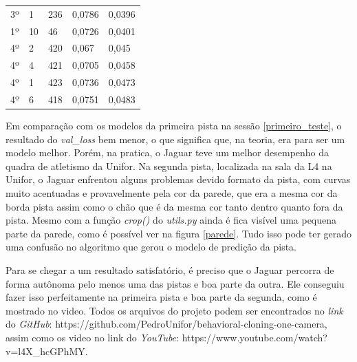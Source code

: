 \begin{table}[H]
\begin{tabular}{|l|l|l|l|l|}
3º                   & 1              & 236                        & 0,0786                 & 0,0396                      \\
1º                   & 10             & 46                         & 0,0726                 & 0,0401                      \\
4º                   & 2              & 420                        & 0,067                  & 0,045                       \\
4º                   & 4              & 421                        & 0,0705                 & 0,0458                      \\
4º                   & 1              & 423                        & 0,0736                 & 0,0473                      \\
4º                   & 6              & 418                        & 0,0751                 & 0,0483 \\ \hline                    
\end{tabular}
\end{table}

Em comparação com os modelos da primeira pista na sessão \ref{primeiro_teste}, o resultado do \textit{val\_loss} bem menor, o que significa que, na teoria, era para ser um modelo melhor. Porém, na pratica, o Jaguar teve um melhor desempenho da quadra de atletismo da Unifor. Na segunda pista, localizada na sala da L4 na Unifor, o Jaguar enfrentou alguns problemas devido formato da pista, com curvas muito acentuadas e provavelmente pela cor da parede, que era a mesma cor da borda pista assim como o chão que é da mesma cor tanto dentro quanto fora da pista. Mesmo com a função \textit{crop()} do \textit{utils.py} ainda é fica visível uma pequena parte da parede, como é possível ver na figura \ref{parede}. Tudo isso pode ter gerado uma confusão no algoritmo que gerou o modelo de predição da pista. 

	\begin{figure}[H]
		\centering
\end{figure}

Para se chegar a um resultado satisfatório, é preciso que o Jaguar percorra de forma autônoma pelo menos uma das pistas e boa parte da outra. Ele conseguiu fazer isso perfeitamente na primeira pista e boa parte da segunda, como é mostrado no video. Todos os arquivos do projeto podem ser encontrados no \textit{link} do \textit{GitHub}: https://github.com/PedroUnifor/behavioral-cloning-one-camera, assim como os video no link do \textit{YouTube}:
https://www.youtube.com/watch?v=l4X\_hcGPhMY.